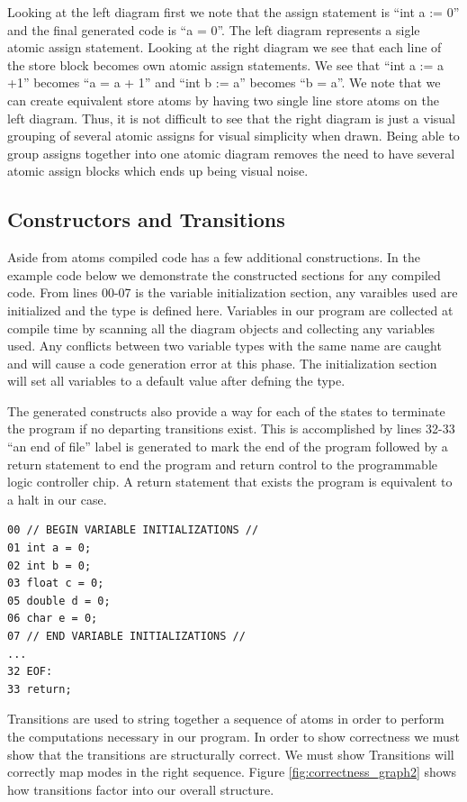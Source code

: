 Looking at the left diagram first we note that the assign statement is ``int a := 0'' and the final generated code is ``a = 0''. The left diagram represents a sigle atomic assign statement. Looking at the right diagram we see that each line of the store block becomes own atomic assign statements. We see that ``int a := a +1'' becomes ``a = a + 1'' and ``int b := a'' becomes ``b = a''. We note that we can create equivalent store atoms by having two single line store atoms on the left diagram. Thus, it is not difficult to see that the right diagram is just a visual grouping of several atomic assigns for visual simplicity when drawn. Being able to group assigns together into one atomic diagram removes the need to have several atomic assign blocks which ends up being visual noise.


\subsection{Constructors and Transitions}

Aside from atoms compiled code has a few additional constructions. In the example code below we demonstrate the constructed sections for any compiled code. From lines 00-07 is the variable initialization section, any varaibles used are initialized and the type is defined here. Variables in our program are collected at compile time by scanning all the diagram objects and collecting any variables used. Any conflicts between two variable types with the same name are caught and will cause a code generation error at this phase. The initialization section will set all variables to a default value after defning the type.

The generated constructs also provide a way for each of the states to terminate the program if no departing transitions exist. This is accomplished by lines 32-33 ``an end of file'' label is generated to mark the end of the program followed by a return statement to end the program and return control to the programmable logic controller chip. A return statement that exists the program is equivalent to a halt in our case.


\begin{lstlisting}[frame=single]
00 // BEGIN VARIABLE INITIALIZATIONS //
01 int a = 0;
02 int b = 0;
03 float c = 0;
05 double d = 0;
06 char e = 0;
07 // END VARIABLE INITIALIZATIONS //
...
32 EOF:
33 return;
\end{lstlisting}


\clearpage
Transitions are used to string together a sequence of atoms in order to perform the computations necessary in our program. In order to show correctness we must show that the transitions are structurally correct. We must show Transitions will correctly map modes in the right sequence. Figure \ref{fig:correctness_graph2} shows how transitions factor into our overall structure.

